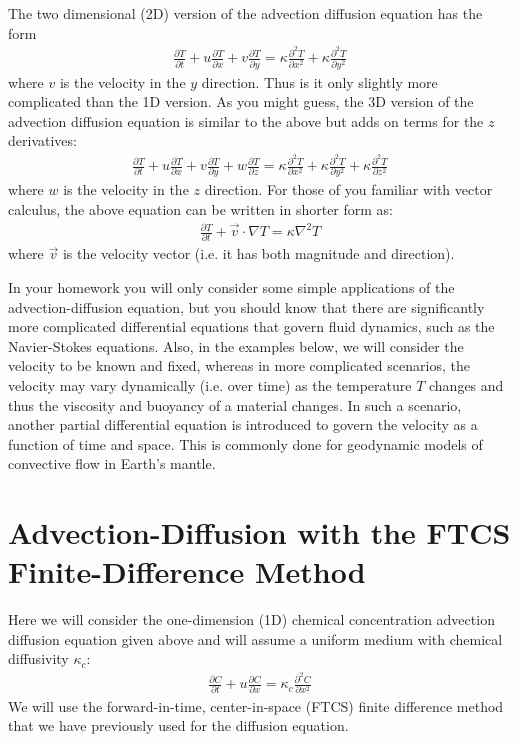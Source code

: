 \documentclass[11pt, oneside]{article}   	%
\begin{document}
The two dimensional (2D) version of the advection diffusion equation has the form
 \begin{eqnarray}
 	\frac{\partial T}{\partial t} + u  \frac{\partial T}{\partial x}  + v  \frac{\partial T}{\partial y} =   \kappa\frac{\partial^2 T}{\partial x^2}  + \kappa\frac{\partial^2 T}{\partial y^2}  
\end{eqnarray}
where $v$ is the velocity in the $y$ direction.  Thus is it only slightly more complicated than the 1D version. As you might guess, the 3D version of the advection diffusion equation is similar to the above but adds on terms for the $z$ derivatives:
 \begin{eqnarray}
 	\frac{\partial T}{\partial t} + u  \frac{\partial T}{\partial x}  + v  \frac{\partial T}{\partial y} + w  \frac{\partial T}{\partial z}  =   \kappa\frac{\partial^2 T}{\partial x^2}  + \kappa\frac{\partial^2 T}{\partial y^2}  + \kappa\frac{\partial^2 T}{\partial z^2}  
\end{eqnarray}
where $w$ is the velocity in the $z$ direction. For those of you familiar with vector calculus, the above equation can be written in shorter form as:
 \begin{eqnarray}
 	\frac{\partial T}{\partial t} + \vec{v} \cdot \nabla T =   \kappa \nabla^2 T 
\end{eqnarray}
where $\vec{v}$ is the velocity vector (i.e. it has both magnitude and direction).

In your homework you will only consider some simple applications of the advection-diffusion equation, but you should know that there are significantly more complicated differential equations that govern fluid dynamics, such as the Navier-Stokes equations.   Also, in the examples below, we will consider the velocity to be known and fixed, whereas in more complicated scenarios, the velocity may vary dynamically (i.e. over time) as the temperature $T$ changes and thus the viscosity and buoyancy of a material changes. In such a scenario, another partial differential equation is introduced to govern the velocity as a function of time and space. This is commonly done for geodynamic models of convective flow in Earth's mantle.

\section*{Advection-Diffusion with the FTCS Finite-Difference Method }
Here we will consider the one-dimension (1D) chemical concentration advection diffusion equation given above and will assume a uniform medium with chemical diffusivity $\kappa_c$:
 \begin{eqnarray}
 	\frac{\partial C}{\partial t} + u  \frac{\partial C}{\partial x}  =   \kappa_c\frac{\partial^2 C}{\partial x^2} 
	\label{1Dad} 
\end{eqnarray}
 We will use the forward-in-time, center-in-space (FTCS) finite difference method that we have previously used for the diffusion equation.
 
\end{document}
